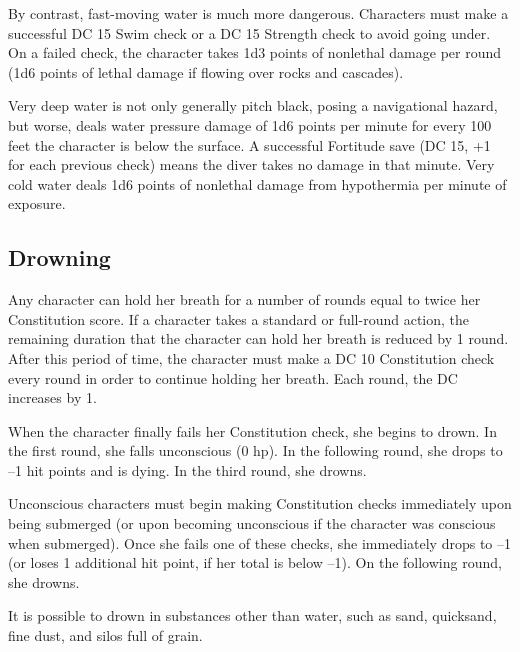 By contrast, fast-moving water is much more dangerous. Characters must make a successful DC 15 Swim check or a DC 15 Strength check to avoid going under. On a failed check, the character takes 1d3 points of nonlethal damage per round (1d6 points of lethal damage if flowing over rocks and cascades).
				
Very deep water is not only generally pitch black, posing a navigational hazard, but worse, deals water pressure damage of 1d6 points per minute for every 100 feet the character is below the surface. A successful Fortitude save (DC 15, +1 for each previous check) means the diver takes no damage in that minute. Very cold water deals 1d6 points of nonlethal damage from hypothermia per minute of exposure.
				
\subsection{Drowning}

				
Any character can hold her breath for a number of rounds equal to twice her Constitution score. If a character takes a standard or full-round action, the remaining duration that the character can hold her breath is reduced by 1 round. After this period of time, the character must make a DC 10 Constitution check every round in order to continue holding her breath. Each round, the DC increases by 1. 
				
When the character finally fails her Constitution check, she begins to drown. In the first round, she falls unconscious (0 hp). In the following round, she drops to --1 hit points and is dying. In the third round, she drowns.
				
Unconscious characters must begin making Constitution checks immediately upon being submerged (or upon becoming unconscious if the character was conscious when submerged). Once she fails one of these checks, she immediately drops to --1 (or loses 1 additional hit point, if her total is below --1). On the following round, she drowns.
				
It is possible to drown in substances other than water, such as sand, quicksand, fine dust, and silos full of grain.
